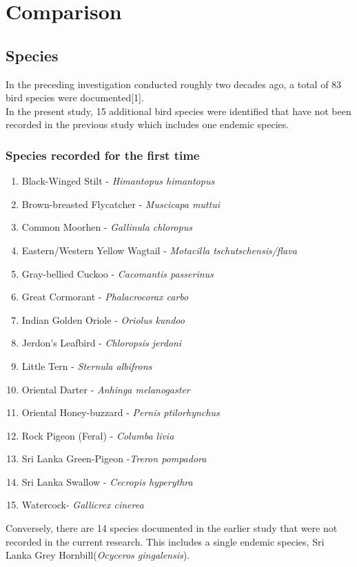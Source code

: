 \chapter{Comparison}
\label{cp:Comparative}
\section{Species}
In the preceding investigation conducted roughly two decades ago, a total of 83 bird species were documented[1]. 
\\
In the present study, 15 additional bird species were identified that have not been recorded in the previous study which includes one endemic species. 

\begin{importantbox}
\subsection{Species recorded for the first time}
\begin{enumerate}
    \item Black-Winged Stilt - \textit{Himantopus himantopus}
    \item Brown-breasted Flycatcher - \textit{Muscicapa muttui}
    \item Common Moorhen - \textit{Gallinula chloropus}
    \item Eastern/Western Yellow Wagtail - \textit{Motacilla tschutschensis/flava}
    \item Gray-bellied Cuckoo - \textit{Cacomantis passerinus}
    \item Great Cormorant - \textit{Phalacrocorax carbo}
    \item Indian Golden Oriole - \textit{Oriolus kundoo}
    \item Jerdon's Leafbird - \textit{Chloropsis jerdoni}
    \item Little Tern - \textit{Sternula albifrons}
    \item Oriental Darter - \textit{Anhinga melanogaster}
    \item Oriental Honey-buzzard - \textit{Pernis ptilorhynchus}
    \item Rock Pigeon (Feral) - \textit{Columba livia}
    \item Sri Lanka Green-Pigeon -\textit{Treron pompadora}
    \item Sri Lanka Swallow - \textit{Cecropis hyperythra}
    \item Watercock- \textit{Gallicrex cinerea}
\end{enumerate}
\end{importantbox}

Conversely, there are 14 species documented in the earlier study that were not recorded in the current research. This includes a single endemic species, Sri Lanka Grey Hornbill(\textit{Ocyceros gingalensis}).
